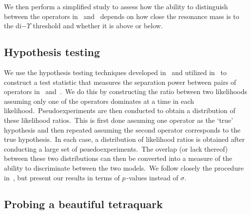 \documentclass[nofootinbib,twocolumn,prl,preprintnumbers]{revtex4-1}
\begin{document}
We then perform a simplified study to assess how the ability to distinguish between the operators in~ and~ depends on how close the resonance mass is to the di$-\Upsilon$ threshold and whether it is above or below.

\subsection{Hypothesis testing} \label{sec:hyptest}

We use the hypothesis testing techniques developed in~\cite{DeRujula:2010ys} and utilized in~\cite{Stolarski:2012ps,Falkowski:2014ffa,Chen:2016ofc} to construct a test statistic that measures the separation power between pairs of operators in~ and~.~We do this by constructing the ratio between two likelihoods assuming only one of the operators dominates at a time in each likelihood.~Pseudoexperiments are then conducted to obtain a distribution of these likelihood ratios.~This is first done assuming one operator as the `true' hypothesis and then repeated assuming the second operator corresponds to the true hypothesis.~In each case, a distribution of likelihood ratios is obtained after conducting a large set of psuedoexperiments.~The overlap (or lack thereof) between these two distributions can then be converted into a measure of the ability to discriminate between the two models.~We follow closely the procedure in~\cite{Stolarski:2012ps}, but present our results in terms of $p\,$-values instead of $\sigma$.

\subsection{Probing a beautiful tetraquark} \label{sec:4b}
\end{document}
